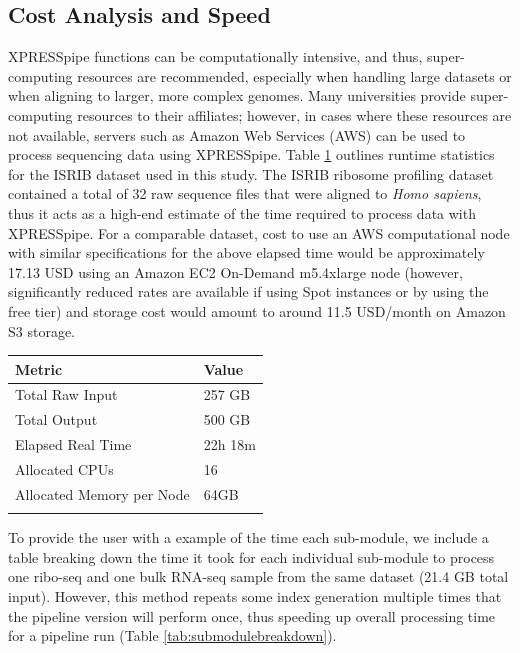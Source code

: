 \documentclass[10pt, oneside]{article}
\begin{document}
\subsection*{Cost Analysis and Speed}
XPRESSpipe functions can be computationally intensive, and thus, super-computing resources are recommended, especially when handling large datasets or when aligning to larger, more complex genomes. Many universities provide super-computing resources to their affiliates; however, in cases where these resources are not available, servers such as Amazon Web Services (AWS) \cite{aws} can be used to process sequencing data using XPRESSpipe. Table \ref{tab:chpc_performance} outlines runtime statistics for the ISRIB dataset used in this study. The ISRIB ribosome profiling dataset contained a total of 32 raw sequence files that were aligned to \textit{Homo sapiens}, thus it acts as a high-end estimate of the time required to process data with XPRESSpipe. For a comparable dataset, cost to use an AWS computational node with similar specifications for the above elapsed time would be approximately 17.13 USD using an Amazon EC2 On-Demand m5.4xlarge node (however, significantly reduced rates are available if using Spot instances or by using the free tier) and storage cost would amount to around 11.5 USD/month on Amazon S3 storage. \\

\begin{table}[h]
    \centering
{}
\begin{tabular}{p{5cm}p{3cm}}
\textbf{Metric} & \textbf{Value} \\
 \hline
 Total Raw Input & 257 GB \\
 \hline
 Total Output & 500 GB \\
 \hline
 Elapsed Real Time & 22h 18m \\
 \hline
 Allocated CPUs & 16 \\
 \hline
 Allocated Memory per Node & 64GB \\
 \label{tab:chpc_performance}
\end{tabular}
\end{table}

To provide the user with a example of the time each sub-module, we include a table breaking down the time it took for each individual sub-module to process one ribo-seq and one bulk RNA-seq sample from the same dataset (21.4 GB total input). However, this method repeats some index generation multiple times that the pipeline version will perform once, thus speeding up overall processing time for a pipeline run (Table \ref{tab:submodulebreakdown}).\\
\end{document}
